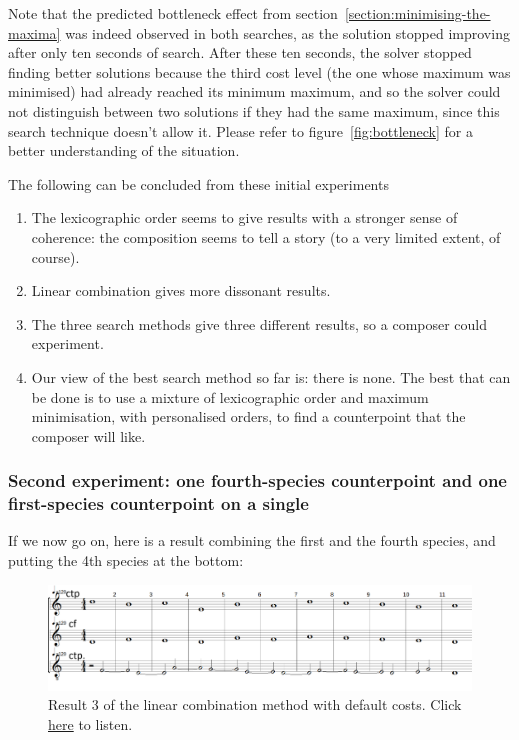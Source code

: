 Note that the predicted bottleneck effect from section~\ref{section:minimising-the-maxima} was indeed observed in both searches, as the solution stopped improving after only ten seconds of search. After these ten seconds, the solver stopped finding better solutions because the third cost level (the one whose maximum was minimised) had already reached its minimum maximum, and so the solver could not distinguish between two solutions if they had the same maximum, since this search technique doesn't allow it. Please refer to figure~\ref{fig:bottleneck} for a better understanding of the situation.

The following can be concluded from these initial experiments
\begin{enumerate}
    \item The lexicographic order seems to give results with a stronger sense of coherence: the composition seems to tell a story (to a very limited extent, of course).
    \item Linear combination gives more dissonant results.
    \item The three search methods give three different results, so a composer could experiment.
    \item Our view of the best search method so far is: there is none. The best that can be done is to use a mixture of lexicographic order and maximum minimisation, with personalised orders, to find a counterpoint that the composer will like.
\end{enumerate}
\subsubsection{Second experiment: one fourth-species counterpoint and one first-species counterpoint on a single \cf}

If we now go on, here is a result combining the first and the fourth species, and putting the 4th species at the bottom:
\begin{figure}[h]
    \centering
    \includegraphics[width=1\textwidth]{Images/Experiments/linear-combination-4sp.png}
    \caption{Result 3 of the linear combination method with default costs. Click \href{https://youtu.be/_VrM76hp1v8}{here} to listen.}
    \label{fig:combili-4sp}
\end{figure}

